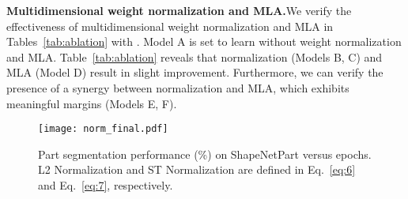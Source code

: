 \documentclass[preprint,12pt]{elsarticle}
\begin{document}
\begin{table}[t]
	\begin{center}
		\caption{Component study of MKConv-3D on ModelNet40 and ShapeNetPart.}
		\label{tab:ablation}\end{center}
\end{table}

\medskip
\noindent\textbf{Multidimensional weight normalization and MLA.}\hspace{0.3cm}We verify the effectiveness of multidimensional weight normalization and MLA in Tables~\ref{tab:ablation} with . 
Model A is set to learn without weight normalization and MLA. Table~\ref{tab:ablation} reveals that normalization (Models B, C) and MLA (Model D) result in slight improvement. Furthermore, we can verify the presence of a synergy between normalization and MLA, which exhibits meaningful margins (Models E, F).








\begin{figure}[t]
	\begin{center}
\texttt{[image: norm\_final.pdf]}
	\end{center}
	\vspace{-0.3cm}
	\caption{Part segmentation performance (\%) on ShapeNetPart versus epochs. L2 Normalization and ST Normalization are defined in Eq.~\ref{eq:6} and Eq.~\ref{eq:7}, respectively.
	}
	\label{fig:norm}
\end{figure}
\end{document}
